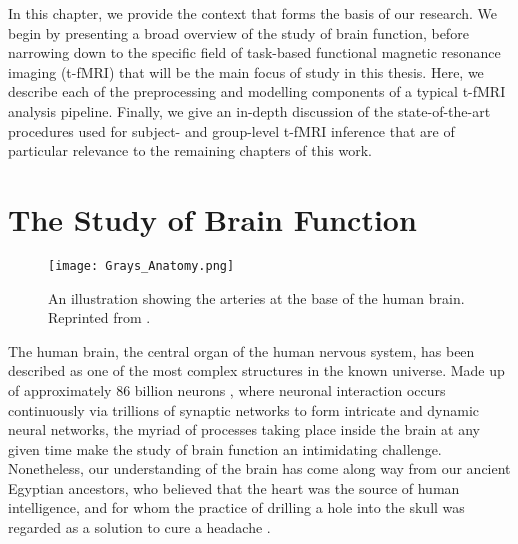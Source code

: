 In this chapter, we provide the context that forms the basis of our research. We begin by presenting a broad overview of the study of brain function, before narrowing down to the specific field of task-based functional magnetic resonance imaging (t-fMRI) that will be the main focus of study in this thesis. Here, we describe each of the preprocessing and modelling components of a typical t-fMRI analysis pipeline. Finally, we give an in-depth discussion of the state-of-the-art procedures used for subject- and group-level t-fMRI inference that are of particular relevance to the remaining chapters of this work. 

\pagebreak

\section{The Study of Brain Function}

\begin{figure}[htbp]
\centering
	\texttt{[image: Grays\_Anatomy.png]}	
\caption{An illustration showing the arteries at the base of the human brain. Reprinted from \citet*{Anatomy1918-do}.}
\end{figure}

The human brain, the central organ of the human nervous system, has been described as one of the most complex structures in the known universe. Made up of approximately 86 billion neurons \citep{Azevedo2009-qj}, where neuronal interaction occurs continuously via trillions of synaptic networks to form intricate and dynamic neural networks, the myriad of processes taking place inside the brain at any given time make the study of brain function an intimidating challenge. Nonetheless, our understanding of the brain has come along way from our ancient Egyptian ancestors, who believed that the heart was the source of human intelligence, and for whom the practice of drilling a hole into the skull was regarded as a solution to cure a headache \citep{Adelman1987-hs, Mohamed2014-gl}. 

